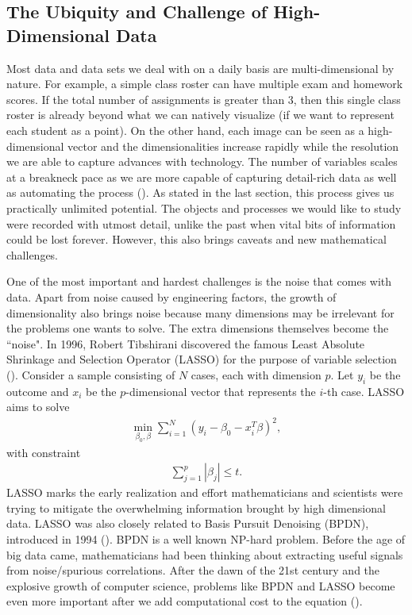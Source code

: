 \subsection{The Ubiquity and Challenge of High-Dimensional Data} \label{intro_chap:sec:tsne:ubiquity}
Most data and data sets we deal with on a daily basis are multi-dimensional by
nature. For example, a simple class roster can have multiple exam and homework
scores. If the total number of assignments is greater than 3, then this single
class roster is already beyond what we can natively visualize (if we want to
represent each student as a point). On the other hand, each image can be seen
as a high-dimensional vector and the dimensionalities increase rapidly while
the resolution we are able to capture advances with technology. The number of
variables scales at a breakneck pace as we are more capable of capturing
detail-rich data as well as automating the process (\cite{Donoho_Dimensions}).
As stated in the last section, this process gives us practically unlimited
potential. The objects and processes we would like to study were recorded with
utmost detail, unlike the past when vital bits of information could be lost
forever. However, this also brings caveats and new mathematical challenges.

One of the most important and hardest challenges is the noise that comes with
data. Apart from noise caused by engineering factors, the growth of
dimensionality also brings noise because many dimensions may be irrelevant for
the problems one wants to solve. The extra dimensions themselves become the
``noise". In 1996, Robert Tibshirani discovered the famous Least Absolute
Shrinkage and Selection Operator (LASSO) for the purpose of variable selection
(\cite{lasso1996}). Consider a sample consisting of $N$ cases, each with
dimension $p$. Let $y_i$ be the outcome and $x_i$ be the $p$-dimensional vector
that represents the $i$-th case. LASSO aims to solve
\begin{align}
    \min_{\beta_0,\beta} \sum_{i=1}^N (y_i - \beta_0 - x_i^T\beta)^2,
\end{align}
with constraint
\begin{align}
    \sum_{j=1}^p |\beta_j| \leq t.
\end{align}
LASSO marks the early realization and effort mathematicians and scientists were trying to mitigate the overwhelming information brought by high dimensional data. LASSO was also closely related to Basis Pursuit Denoising (BPDN), introduced in 1994 (\cite{BPDN}). BPDN is a well known NP-hard problem. Before the age of big data came, mathematicians had been thinking about extracting useful signals from noise/spurious correlations. After the dawn of the 21st century and the explosive growth of computer science, problems like BPDN and LASSO become even more important after we add computational cost to the equation (\cite{variableselection2010}).

